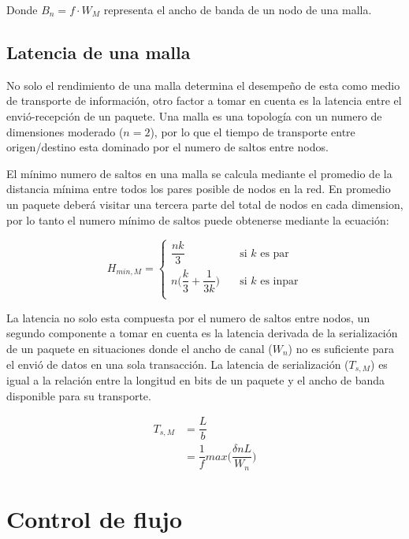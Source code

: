 Donde $B_{n} = f \cdot W_{M}$ representa el ancho de banda de un nodo de una malla.

\subsection{Latencia de una malla}

No solo el rendimiento de una malla determina el desempeño de esta como medio de transporte de información, otro factor a tomar en cuenta es la latencia entre el envió-recepción de un paquete. Una malla es una topología con un numero de dimensiones moderado ($n = 2$), por lo que el tiempo de transporte entre origen/destino esta dominado por el numero de saltos entre nodos.

El mínimo numero de saltos en una malla se calcula mediante el promedio de la distancia mínima entre todos los pares posible de nodos en la red. En promedio un paquete deberá visitar una tercera parte del total de nodos en cada dimension, por lo tanto el numero mínimo de saltos puede obtenerse mediante la ecuación:

\[ H_{min,M} =
  \begin{cases}
    \dfrac{nk}{3}       				& \quad \text{si } k \text{ es par}\\
    n\bigg(\dfrac{k}{3} + \dfrac{1}{3k}\bigg)	& \quad \text{si } k \text{ es inpar}\\
  \end{cases}
\]

La latencia no solo esta compuesta por el numero de saltos entre nodos, un segundo componente a tomar en cuenta es la latencia derivada de la serialización de un paquete en situaciones donde el ancho de canal ($W_{n}$) no es suficiente para el envió de datos en una sola transacción. La latencia de serialización ($T_{s,M}$) es igual a la relación entre la longitud en bits de un paquete y el ancho de banda disponible para su transporte.

\begin{equation}
	\label{ecu:ch2_latencia_serial}
		\begin{split}
			T_{s, M} &= \dfrac{L}{b} \\
			         &= \dfrac{1}{f} max \bigg( \dfrac{\delta nL}{W_{n}} \bigg)
		\end{split}
\end{equation}




\section{Control de flujo}

